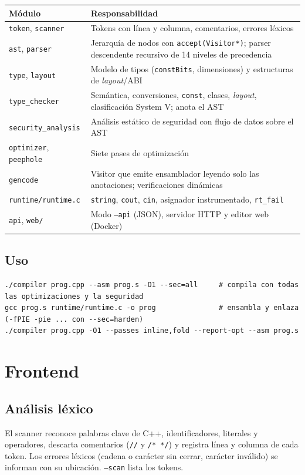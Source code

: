 \documentclass[11pt,a4paper]{article}
\newcommand{\cod}[1]{\texttt{#1}}
\begin{document}
\begin{center}
\small
\begin{tabular}{lp{10.2cm}}
\toprule Módulo & Responsabilidad \\ \midrule
\cod{token}, \cod{scanner} & Tokens con línea y columna, comentarios, errores léxicos \\
\cod{ast}, \cod{parser} & Jerarquía de nodos con \cod{accept(Visitor*)}; parser descendente recursivo de 14 niveles de precedencia \\
\cod{type}, \cod{layout} & Modelo de tipos (\cod{constBits}, dimensiones) y estructuras de \emph{layout}/ABI \\
\cod{type\_checker} & Semántica, conversiones, \cod{const}, clases, \emph{layout}, clasificación System V; anota el AST \\
\cod{security\_analysis} & Análisis estático de seguridad con flujo de datos sobre el AST \\
\cod{optimizer}, \cod{peephole} & Siete pases de optimización \\
\cod{gencode} & Visitor que emite ensamblador leyendo solo las anotaciones; verificaciones dinámicas \\
\cod{runtime/runtime.c} & \cod{string}, \cod{cout}, \cod{cin}, asignador instrumentado, \cod{rt\_fail} \\
\cod{api}, \cod{web/} & Modo \cod{--api} (JSON), servidor HTTP y editor web (Docker) \\
\bottomrule
\end{tabular}
\end{center}

\subsection{Uso}
\begin{lstlisting}
./compiler prog.cpp --asm prog.s -O1 --sec=all     # compila con todas las optimizaciones y la seguridad
gcc prog.s runtime/runtime.c -o prog               # ensambla y enlaza (-fPIE -pie ... con --sec=harden)
./compiler prog.cpp -O1 --passes inline,fold --report-opt --asm prog.s
\end{lstlisting}

\section{Frontend}
\label{sec:front}
\subsection{Análisis léxico}
El scanner reconoce palabras clave de C++, identificadores, literales y operadores, descarta comentarios
(\cod{//} y \cod{/* */}) y registra línea y columna de cada token. Los errores léxicos (cadena o carácter sin cerrar,
carácter inválido) se informan con su ubicación. \cod{--scan} lista los tokens.
\end{document}
